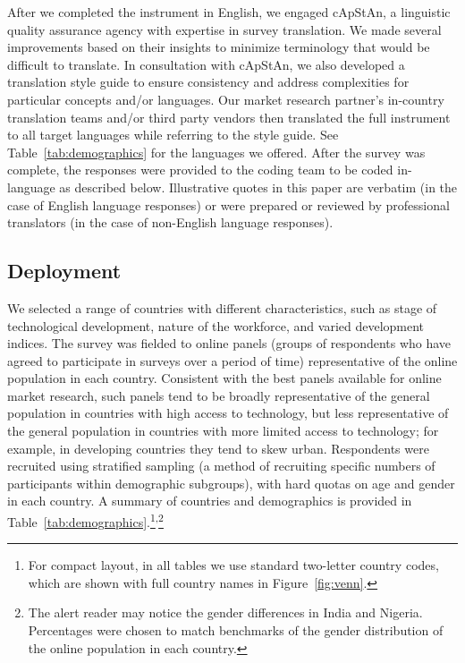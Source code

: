 \documentclass[11pt]{article} %
\begin{document}
After we completed the instrument in English, we engaged cApStAn, a linguistic quality assurance agency with expertise in survey translation. We made several improvements based on their insights to minimize terminology that would be difficult to translate. In consultation with cApStAn, we also developed a translation style guide to ensure consistency and address complexities for particular concepts and/or languages. Our market research partner's in-country translation teams and/or third party vendors then translated the full instrument to all target languages while referring to the style guide. See Table~\ref{tab:demographics} for the languages we offered. After the survey was complete, the responses were provided to the coding team to be coded in-language as described below. Illustrative quotes in this paper are verbatim (in the case of English language responses) or were prepared or reviewed by professional translators (in the case of non-English language responses).

\subsection{Deployment}
We selected a range of countries with different characteristics, such as stage of technological development, nature of the workforce, and varied development indices. The survey was fielded to online panels (groups of respondents who have agreed to participate in surveys over a period of time) representative of the online population in each country. Consistent with the best panels available for online market research, such panels tend to be broadly representative of the general population in countries with high access to technology, but less representative of the general population in countries with more limited access to technology; for example, in developing countries they tend to skew urban. Respondents were recruited using stratified sampling (a method of recruiting specific numbers of participants within demographic subgroups), with hard quotas on age and gender in each country. A summary of countries and demographics is provided in Table~\ref{tab:demographics}.\footnote{For compact layout, in all tables we use standard two-letter country codes, which are shown with full country names in Figure~\ref{fig:venn}.}\textsuperscript{,}\footnote{The alert reader may notice the gender differences in India and Nigeria. Percentages were chosen to match benchmarks of the gender distribution of the online population in each country.}
\end{document}
